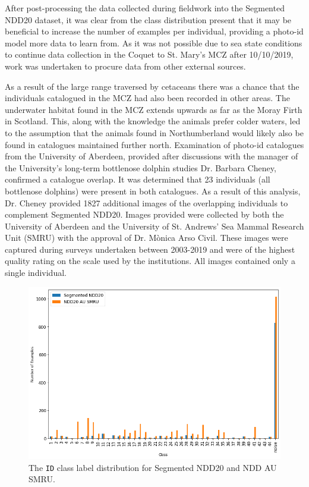 After post-processing the data collected during fieldwork into the Segmented NDD20 dataset, it was clear from the class distribution present that it may be beneficial to increase the number of examples per individual, providing a photo-id model more data to learn from. As it was not possible due to sea state conditions to continue data collection in the Coquet to St. Mary's MCZ after 10/10/2019, work was undertaken to procure data from other external sources. 

As a result of the large range traversed by cetaceans \cite{shane_ecology_1986} there was a chance that the individuals catalogued in the MCZ had also been recorded in other areas. The underwater habitat found in the MCZ extends upwards as far as the Moray Firth in Scotland. This, along with the knowledge the animals prefer colder waters, led to the assumption that the animals found in Northumberland would likely also be found in catalogues maintained further north. Examination of photo-id catalogues from the University of Aberdeen, provided after discussions with the manager of the University's long-term bottlenose dolphin studies Dr. Barbara Cheney, confirmed a catalogue overlap. It was determined that 23 individuals (all bottlenose dolphins) were present in both catalogues. As a result of this analysis, Dr. Cheney provided 1827 additional images of the overlapping individuals to complement Segmented NDD20. Images provided were collected by both the University of Aberdeen and the University of St. Andrews' Sea Mammal Research Unit (SMRU) with the approval of Dr. M\`{o}nica Arso Civil. These images were captured during surveys undertaken between 2003-2019 and were of the highest quality rating on the scale used by the institutions. All images contained only a single individual. 

\begin{figure}
	\begin{center}
		\includegraphics[scale=0.5]{Chapter4/figs/seg-ndd20-and-ndd20-au-smru-dist}
	\end{center}
	\caption{The \texttt{ID} class label distribution for Segmented NDD20 and NDD AU SMRU.}
	\label{fig:segmented-ndd20-and-ndd20-au-smru-dist}
\end{figure}

